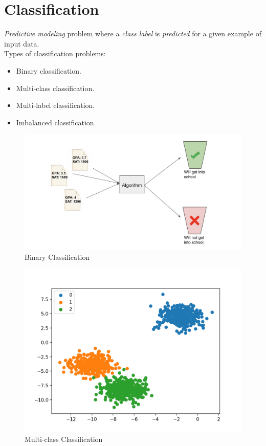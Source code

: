 \documentclass[
	number={1},
	title={Machine Learning Fundamentals}
]{cs584notes}
\begin{document}
\section{Classification}\label{sec:classification}

\emph{Predictive modeling} problem where a \emph{class label} is \emph{predicted} for a given example of input data.\\

Types of classification problems:
\begin{itemize}
	\item Binary classification.
	\item Multi-class classification.
	\item Multi-label classification.
	\item Imbalanced classification.
\end{itemize}

\begin{figure}[H]
	\centering
	\includegraphics[width=\textwidth]{figures/1/binary_classification}
	\caption{Binary Classification}
	\label{fig:binary-classification}
\end{figure}

\begin{figure}[H]
	\centering
	\includegraphics[width=\textwidth]{figures/1/multi_class_classification}
	\caption{Multi-class Classification}
	\label{fig:multi-class-classification}
\end{figure}
\end{document}
